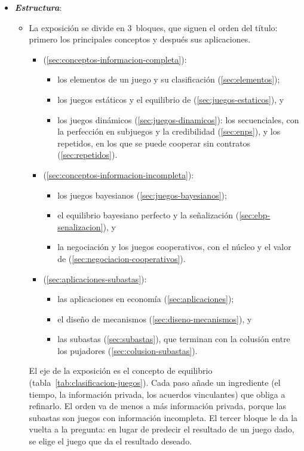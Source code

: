 \documentclass[11pt]{article}
\begin{document}
\begin{itemize}
\item \textbf{\emph{Estructura}}:
  \begin{itemize}
  \item La exposición se divide en 3~bloques, que siguen el orden del título: primero los principales conceptos y después sus aplicaciones.
  \begin{itemize}
  \item {} (\ref{sec:conceptos-informacion-completa}):
    \begin{itemize}
    \item los elementos de un juego y su clasificación (\ref{sec:elementos});
    \item los juegos estáticos y el equilibrio de  (\ref{sec:juegos-estaticos}), y
    \item los juegos dinámicos (\ref{sec:juegos-dinamicos}): los secuenciales, con la perfección en subjuegos y la credibilidad (\ref{sec:enps}), y los repetidos, en los que se puede cooperar sin contratos (\ref{sec:repetidos}).
    \end{itemize}
  \item {} (\ref{sec:conceptos-informacion-incompleta}):
    \begin{itemize}
    \item los juegos bayesianos (\ref{sec:juegos-bayesianos});
    \item el equilibrio bayesiano perfecto y la señalización (\ref{sec:ebp-senalizacion}), y
    \item la negociación y los juegos cooperativos, con el núcleo y el valor de  (\ref{sec:negociacion-cooperativos}).
    \end{itemize}
  \item {} (\ref{sec:aplicaciones-subastas}):
    \begin{itemize}
    \item las aplicaciones en economía (\ref{sec:aplicaciones});
    \item el diseño de mecanismos (\ref{sec:diseno-mecanismos}), y
    \item las subastas (\ref{sec:subastas}), que terminan con la colusión entre los pujadores (\ref{sec:colusion-subastas}).
    \end{itemize}
  \end{itemize}
  El eje de la exposición es el concepto de equilibrio (tabla~\ref{tab:clasificacion-juegos}). Cada paso añade un ingrediente (el tiempo, la información privada, los acuerdos vinculantes) que obliga a refinarlo. El orden va de menos a más información privada, porque las subastas son juegos con información incompleta. El tercer bloque le da la vuelta a la pregunta: en lugar de predecir el resultado de un juego dado, se elige el juego que da el resultado deseado.


\end{itemize}
\end{itemize}
\end{document}
